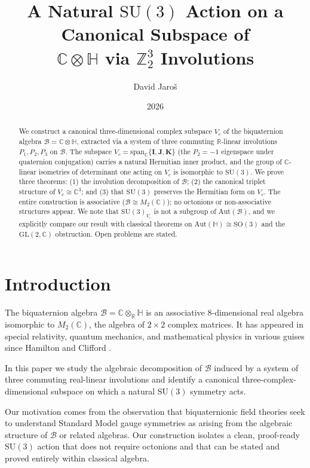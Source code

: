 \documentclass[12pt,a4paper]{article}
\title{%
  A Natural $\mathrm{SU}(3)$ Action on a Canonical Subspace of\\
  $\mathbb{C}\otimes\mathbb{H}$ via $\mathbb{Z}_2^3$ Involutions
}
\author{David Jaro\v{s}}
\date{2026}
\theoremstyle{remark}
\newcommand{\B}{\mathcal{B}}          %
\newcommand{\C}{\mathbb{C}}
\newcommand{\R}{\mathbb{R}}
\newcommand{\H}{\mathbb{H}}
\begin{document}
\maketitle

\begin{abstract}
We construct a canonical three-dimensional complex subspace $V_c$ of the
biquaternion algebra $\B = \C\otimes\H$, extracted via a system of three
commuting $\R$-linear involutions $P_1, P_2, P_3$ on $\B$.  The subspace
$V_c = \mathrm{span}_\C\{\mathbf{I},\mathbf{J},\mathbf{K}\}$ (the $P_2 = -1$
eigenspace under quaternion conjugation) carries a natural Hermitian inner
product, and the group of $\C$-linear isometries of determinant one acting on
$V_c$ is isomorphic to $\mathrm{SU}(3)$.  We prove three theorems: (1) the
involution decomposition of $\B$; (2) the canonical triplet structure of
$V_c \cong \C^3$; and (3) that $\mathrm{SU}(3)$ preserves the Hermitian form
on $V_c$.  The entire construction is associative ($\B \cong M_2(\C)$); no
octonions or non-associative structures appear.  We note that
$\mathrm{SU}(3)_{V_c}$ is not a subgroup of $\mathrm{Aut}(\B)$, and we
explicitly compare our result with classical theorems on $\mathrm{Aut}(\H)
\cong \mathrm{SO}(3)$ and the $\mathrm{GL}(2,\C)$ obstruction.  Open problems
are stated.
\end{abstract}

\tableofcontents

\section{Introduction}

The biquaternion algebra $\B = \C\otimes_\R\H$ is an associative
$8$-dimensional real algebra isomorphic to $M_2(\C)$, the algebra of
$2\times 2$ complex matrices.  It has appeared in special relativity, quantum
mechanics, and mathematical physics in various guises since Hamilton and
Clifford \cite{Hamilton1866,Clifford1878}.

In this paper we study the algebraic decomposition of $\B$ induced by a
system of three commuting real-linear involutions and identify a canonical
three-complex-dimensional subspace on which a natural $\mathrm{SU}(3)$
symmetry acts.

Our motivation comes from the observation that biquaternionic field theories
\cite{Dixon1994,Furey2016} seek to understand Standard Model gauge symmetries
as arising from the algebraic structure of $\B$ or related algebras.  Our
construction isolates a clean, proof-ready $\mathrm{SU}(3)$ action that does
not require octonions and that can be stated and proved entirely within
classical algebra.
\end{document}
